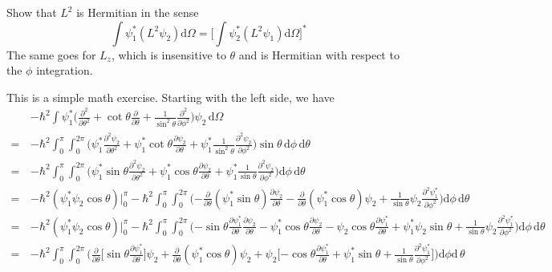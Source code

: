 \documentclass[../principles-of-quantum-mechanics.tex]{subfiles}
\begin{document}
\begin{questions}
		\question Show that $L^2$ is Hermitian in the sense
		$$\int \psi_1^*(L^2\psi_2)\mathrm{d}\Omega = \Big[\int\psi_2^*(L^2\psi_1)\mathrm{d}\Omega\Big]^*$$
		The same goes for $L_z$, which is insensitive to $\theta$ and is Hermitian with respect to the $\phi$ integration.
		
		\begin{solution}
			This is a simple math exercise. Starting with the left side, we have
			\begin{align*}
				&{-\hbar^2}\int\psi_1^*\Big(\frac{\partial^2}{\partial\theta^2} + \cot\theta\frac{\partial}{\partial \theta} + \frac{1}{\sin^2\theta}\frac{\partial^2}{\partial\phi^2}\Big)\psi_2\,\mathrm{d}\Omega \\
				=\,&{-\hbar^2}\int_0^\pi\int_0^{2\pi}\Big(\psi_1^*\frac{\partial^2\psi_2}{\partial\theta^2} + \psi_1^*\cot\theta\frac{\partial\psi_2}{\partial\theta} + \psi_1^*\frac{1}{\sin^2\theta}\frac{\partial^2\psi_2}{\partial\phi^2}\Big)\sin\theta\,\mathrm{d}\phi\,\mathrm{d}\theta \\
				=\,&{-\hbar^2}\int_0^\pi\int_0^{2\pi}\Big(\psi_1^*\sin\theta\frac{\partial^2\psi_2}{\partial\theta^2} + \psi_1^*\cos\theta\frac{\partial\psi_2}{\partial\theta} + \psi_1^*\frac{1}{\sin\theta}\frac{\partial^2\psi_2}{\partial\phi^2}\Big)\mathrm{d}\phi\,\mathrm{d}\theta \\
				=\,&{-\hbar^2}(\psi_1^*\psi_2\cos\theta)\big|_0^{\pi} - \hbar^2\int_0^{\pi}\int_0^{2\pi}\Big({-\frac{\partial}{\partial\theta}}(\psi_1^*\sin\theta)\frac{\partial\psi_2}{\partial\theta} - \frac{\partial}{\partial\theta}(\psi_1^*\cos\theta)\psi_2 + \frac{1}{\sin\theta}\psi_2\frac{\partial^2\psi_1^*}{\partial\phi^2}\Big)\mathrm{d}\phi\,\mathrm{d}\theta \\
				=\,&{-\hbar^2}(\psi_1^*\psi_2\cos\theta)\big|_0^{\pi} - \hbar^2\int_0^{\pi}\int_0^{2\pi}\Big({-\sin\theta}\frac{\partial\psi_1^*}{\partial\theta}\frac{\partial\psi_2}{\partial \theta} - \psi_1^*\cos\theta\frac{\partial \psi_2}{\partial\theta} - \psi_2\cos\theta\frac{\partial\psi_1^*}{\partial\theta} + \psi_1^*\psi_2\sin\theta + \frac{1}{\sin\theta}\psi_2\frac{\partial^2\psi_1^*}{\partial\phi^2}\Big)\mathrm{d}\phi\,\mathrm{d}\theta \\
				=\,&{-\hbar^2}\int_0^{\pi}\int_0^{2\pi}\Big(\frac{\partial}{\partial\theta}\Big[\sin\theta\frac{\partial\psi_1^*}{\partial\theta}\Big]\psi_2 + \frac{\partial}{\partial\theta}(\psi_1^*\cos\theta)\psi_2 + \psi_2\Big[{-\cos\theta}\frac{\partial\psi_1^*}{\partial\theta} + \psi_1^*\sin\theta + \frac{1}{\sin\theta}\frac{\partial^2\psi_1^*}{\partial\phi^2}\Big]\Big)\mathrm{d}\phi\mathrm{d}\,\theta \\

\end{align*}
\end{solution}
\end{questions}
\end{document}
